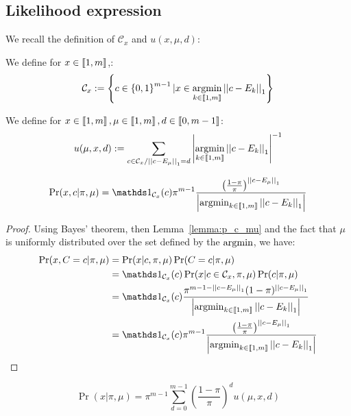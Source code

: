 \subsection{Likelihood expression}

We recall the definition of $\mathcal{C}_x$ and $u(x, \mu, d)$:
\begin{definition}
    We define for $x \in \left\llbracket1, m\right\rrbracket$,:
\[ \mathcal{C}_x := \left\{ c \in \left\{ 0, 1 \right\}^{m-1} | x \in \operatorname*{argmin}_{k \in \left\llbracket1, m\right\rrbracket} \left|\left|c - E_k\right|\right|_1  \right\}\]
\end{definition}

\begin{definition}
    We define for $x \in \left\llbracket1, m\right\rrbracket, \mu \in \left\llbracket1, m\right\rrbracket, d \in \left\llbracket0, m-1\right\rrbracket$:
    \[ u(\mu, x, d) := \sum_{c \in \mathcal{C}_x / \left|\left|c - E_{\mu}\right|\right|_1 = d}  \left|\operatorname*{argmin}_{k \in \left\llbracket1, m\right\rrbracket} \left|\left|c - E_k\right|\right|_1\right|^{-1}\]
\end{definition}



\begin{lemma}
    \label{lemma:p_x_c_knowing_pi_mu_appendix}
    \[\Pr(x, c | \pi, \mu) = \indic{}_{\mathcal{C}_x}(c) \pi^{m-1}  \frac{\left(\frac{1 - \pi}{\pi}\right)^{\norm{c - E_{\mu}}_1}}{\card{\argmin_{k \in \bbrack{1, m}} \norm{c - E_k}_1}} \]
\end{lemma}

\begin{proof}
    Using Bayes' theorem, then Lemma~\ref{lemma:p_c_mu} and the fact that $\mu$ is uniformly distributed over the set defined by the $\operatorname*{argmin}$, we have:
    \begin{align}
        \Pr(x, C=c | \pi, \mu)
        &= \Pr(x | c, \pi, \mu) \Pr(C = c | \pi, \mu)\\
        &=  \indic{}_{\mathcal{C}_x}(c) \Pr(x | c \in \mathcal{C}_x, \pi, \mu) \Pr(c | \pi, \mu)\\
        &= \indic{}_{\mathcal{C}_x}(c) \frac{\pi^{m - 1 - \norm{c - E_{\mu}}_1} (1 - \pi)^{\norm{c - E_{\mu}}_1}}{\card{\argmin_{k \in \bbrack{1, m}} \norm{c - E_k}_1}}\\
        &= \indic{}_{\mathcal{C}_x}(c) \pi^{m-1}  \frac{\left(\frac{1 - \pi}{\pi}\right)^{\norm{c - E_{\mu}}_1}}{\card{\argmin_{k \in \bbrack{1, m}} \norm{c - E_k}_1}}
    \end{align}
\end{proof}


\begin{thm}
    \label{thm:p_x_knowing_pi_mu}
    \[\Pr(x | \pi, \mu) = \pi^{m-1} \sum_{d = 0}^{m-1} \left(\frac{1 - \pi}{\pi}\right)^d u(\mu, x, d)\]
\end{thm}

